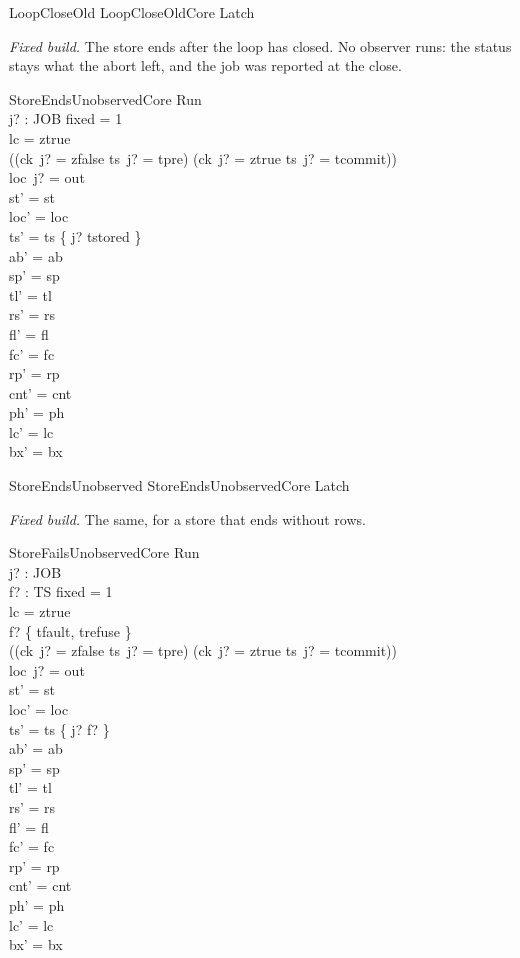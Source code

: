 \documentclass[a4paper,10pt,fleqn]{article}
\begin{document}
\begin{zed}
LoopCloseOld  LoopCloseOldCore \land Latch
\end{zed}

\emph{Fixed build.} The store ends after the loop has closed. No observer runs:
the status stays what the abort left, and the job was reported at the close.

\begin{schema}{StoreEndsUnobservedCore}
\Delta Run \\ j? : JOB
\where
fixed = 1 \\
lc = ztrue \\
((ck~j? = zfalse \land ts~j? = tpre) \lor (ck~j? = ztrue \land ts~j? = tcommit)) \\
loc~j? = out \\
st' = st \\
loc' = loc \\
ts' = ts \oplus \{ j? \mapsto tstored \} \\
ab' = ab \\
sp' = sp \\
tl' = tl \\
rs' = rs \\
fl' = fl \\
fc' = fc \\
rp' = rp \\
cnt' = cnt \\
ph' = ph \\
lc' = lc \\
bx' = bx
\end{schema}

\begin{zed}
StoreEndsUnobserved  StoreEndsUnobservedCore \land Latch
\end{zed}

\emph{Fixed build.} The same, for a store that ends without rows.

\begin{schema}{StoreFailsUnobservedCore}
\Delta Run \\ j? : JOB \\ f? : TS
\where
fixed = 1 \\
lc = ztrue \\
f? \in \{ tfault, trefuse \} \\
((ck~j? = zfalse \land ts~j? = tpre) \lor (ck~j? = ztrue \land ts~j? = tcommit)) \\
loc~j? = out \\
st' = st \\
loc' = loc \\
ts' = ts \oplus \{ j? \mapsto f? \} \\
ab' = ab \\
sp' = sp \\
tl' = tl \\
rs' = rs \\
fl' = fl \\
fc' = fc \\
rp' = rp \\
cnt' = cnt \\
ph' = ph \\
lc' = lc \\
bx' = bx
\end{schema}
\end{document}
